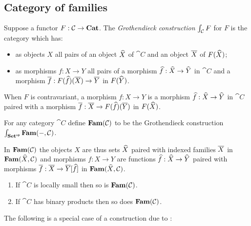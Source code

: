\subsection{Category of families}
\label{sec:grothendieck}

\begin{definition}
Suppose a functor $F: \mathcal{C} \to \mathbf{Cat}$. The \emph{Grothendieck construction} $\int_{\mathcal{C}}F$ for
$F$ is the category which has:
\begin{itemize}
\item as objects $X$ all pairs of an object $\widehat{X}$ of $\cat{C}$ and an object $\overline{X}$ of $F(\widehat{X})$;
\item as morphisms $f: X \to Y$ all pairs of a morphism $\widehat{f}: \widehat{X} \to \widehat{Y}$ in $\cat{C}$ and a
morphism $\overline{f}: F(\widehat{f})(\overline{X}) \to \overline{Y}$ in $F(\widehat{Y})$.
\end{itemize}
\end{definition}

\noindent When $F$ is contravariant, a morphism $f: X \to Y$ is a morphism $\widehat{f}: \widehat{X} \to \widehat{Y}$ in
$\cat{C}$ paired with a morphism $\overline{f}: \overline{X} \to F(\widehat{f})(\overline{Y})$ in $F(\widehat{X})$.

\begin{definition}
For any category $\cat{C}$ define $\mathbf{Fam}(\mathcal{C})$ to be the Grothendieck construction
$\int_{\mathbf{Set}^{\mathsf{op}}}\mathbf{Fam}(-,\mathcal{C})$.
\end{definition}

\noindent In $\mathbf{Fam}(\mathcal{C})$ the objects $X$ are thus sets $\widehat{X}$ paired with indexed families $\overline{X}$
in $\mathbf{Fam}(\widehat{X},\mathcal{C})$ and morphisms $f: X \to Y$ are functions $\widehat{f}: \widehat{X} \to \widehat{Y}$ paired with
morphisms $\overline{f}: \overline{X} \to \overline{Y}[\widehat{f}]$ in $\mathbf{Fam}(\widehat{X},\mathcal{C})$.

\begin{proposition}
\item
\begin{enumerate}
\item If $\cat{C}$ is locally small then so is $\mathbf{Fam}(\mathcal{C})$.
\item If $\cat{C}$ has binary products then so does $\mathbf{Fam}(\mathcal{C})$.
\end{enumerate}
\end{proposition}

The following is a special case of a construction due to \citet{nunes2023}:

